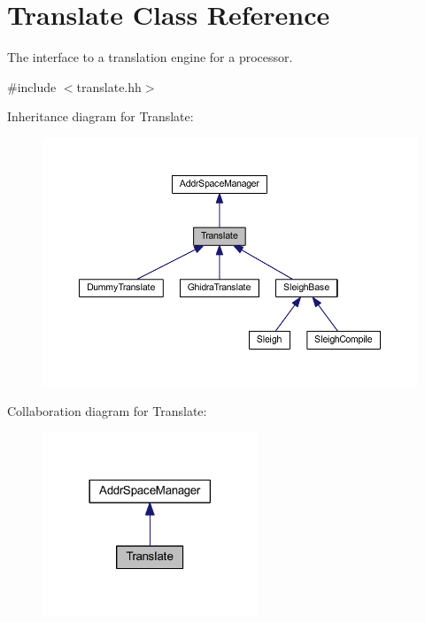 \hypertarget{class_translate}{}\section{Translate Class Reference}
\label{class_translate}


The interface to a translation engine for a processor.  




{\ttfamily \#include $<$translate.\+hh$>$}



Inheritance diagram for Translate\+:
\nopagebreak
\begin{figure}[H]
\begin{center}
\leavevmode
\includegraphics[width=350pt]{class_translate__inherit__graph}
\end{center}
\end{figure}


Collaboration diagram for Translate\+:
\nopagebreak
\begin{figure}[H]
\begin{center}
\leavevmode
\includegraphics[width=182pt]{class_translate__coll__graph}
\end{center}
\end{figure}
